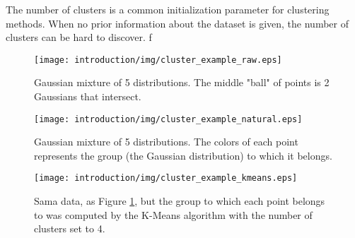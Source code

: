 The number of clusters is a common initialization parameter for clustering methods.
When no prior information about the dataset is given, the number of clusters can be hard to discover.
f
\begin{figure}[hbtp]
\centering
\texttt{[image: introduction/img/cluster\_example\_raw.eps]}
\caption{Gaussian mixture of 5 distributions. The middle "ball" of points is 2 Gaussians that intersect.}
\label{fig:intro raw}
\end{figure}

\begin{figure}[hbtp]
\centering
\texttt{[image: introduction/img/cluster\_example\_natural.eps]}
\caption{Gaussian mixture of 5 distributions. The colors of each point represents the group (the Gaussian distribution) to which it belongs.}
\label{fig:intro natural}
\end{figure}

\begin{figure}[hbtp]
\centering
\texttt{[image: introduction/img/cluster\_example\_kmeans.eps]}
\caption{Sama data, as Figure \ref{fig:intro raw}, but the group to which each point belongs to was computed by the K-Means algorithm with the number of clusters set to 4.}
\label{fig:intro kmeans}
\end{figure}

% 

